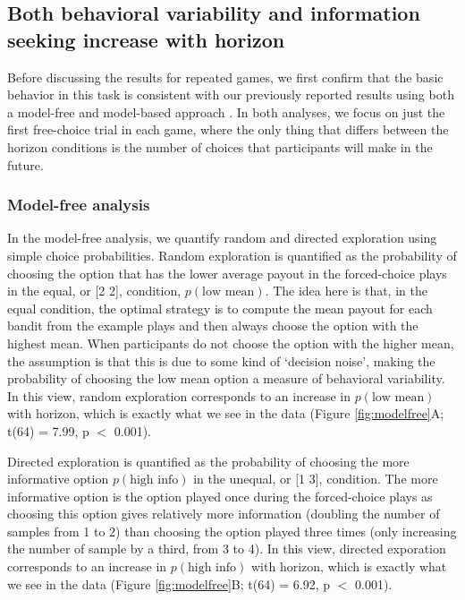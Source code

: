 \documentclass[12pt]{article}
\begin{document}
{	\subsection*{Both behavioral variability and information seeking increase with horizon}
	Before discussing the results for repeated games, we first confirm that the basic behavior in this task is consistent with our previously reported results using both a model-free and model-based approach \citep{wilson2014}. In both analyses, we focus on just the first free-choice trial in each game, where the only thing that differs between the horizon conditions is the number of choices that participants will make in the future. 
	
	\subsubsection*{Model-free analysis}
	In the model-free analysis, we quantify random and directed exploration using simple choice probabilities. Random exploration is quantified as the probability of choosing the option that has the lower average payout in the forced-choice plays in the equal, or [2 2], condition, $p(\mbox{low mean})$. The idea here is that, in the equal condition, the optimal strategy is to compute the mean payout for each bandit from the example plays and then always choose the option with the highest mean. When participants do not choose the option with the higher mean, the assumption is that this is due to some kind of `decision noise', making the probability of choosing the low mean option a measure of behavioral variability. In this view, random exploration corresponds to an increase in $p(\mbox{low mean})$ with horizon, which is exactly what we see in the data (Figure \ref{fig:modelfree}A; t(64) = 7.99, p $<$ 0.001).
	
	Directed exploration is quantified as the probability of choosing the more informative option $p(\mbox{high info})$ in the unequal, or [1 3], condition. The more informative option is the option played once during the forced-choice plays as choosing this option gives relatively more information (doubling the number of samples from 1 to 2) than choosing the option played three times (only increasing the number of sample by a third, from 3 to 4). In this view, directed exporation corresponds to an increase in $p(\mbox{high info})$ with horizon, which is exactly what we see in the data (Figure \ref{fig:modelfree}B; t(64) = 6.92, p $<$ 0.001).
	
}
\end{document}
